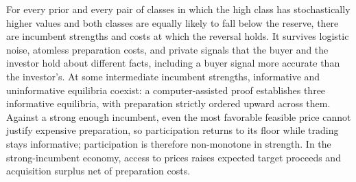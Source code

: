 For every prior and every pair of classes in which the high class has stochastically higher values and both classes are equally likely to fall below the reserve, there are incumbent strengths and costs at which the reversal holds. It survives logistic noise, atomless preparation costs, and private signals that the buyer and the investor hold about different facts, including a buyer signal more accurate than the investor's. At some intermediate incumbent strengths, informative and uninformative equilibria coexist: a computer-assisted proof establishes three informative equilibria, with preparation strictly ordered upward across them. Against a strong enough incumbent, even the most favorable feasible price cannot justify expensive preparation, so participation returns to its floor while trading stays informative; participation is therefore non-monotone in strength. In the strong-incumbent economy, access to prices raises expected target proceeds and acquisition surplus net of preparation costs.
